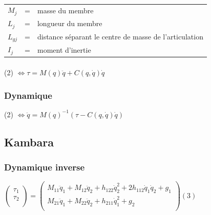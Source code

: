 \documentclass[pdftex,a4paper,11pt]{article}
\begin{document}
\paragraph{}
\begin{tabular}{lcl}
    $M_j$ & = & masse du membre \\
    $L_j$ & = & longueur du membre \\
    $L_{gj}$ & = & distance séparant le centre de masse de l'articulation \\
    $I_{j}$ & = & moment d'inertie \\
\end{tabular}

\paragraph{}
(2) $\Leftrightarrow \tau = M(q)\ddot{q} + C(q, \dot{q}) \dot{q}  $

\subsubsection{Dynamique}
(2) $\Leftrightarrow \ddot{q} = M(q)^{-1} (\tau - C(q, \dot{q}) \dot{q}) $


\subsection{Kambara}

\subsubsection{Dynamique inverse}
$
\begin{pmatrix}
    \tau_1 \\
    \tau_2 \\
\end{pmatrix}
=
\begin{pmatrix}
    M_{11}\ddot{q}_1 + M_{12}\ddot{q}_2 + h_{122}\dot{q}_2^2 + 2h_{112}\dot{q}_1\dot{q}_2 + g_1 \\
    M_{21}\ddot{q}_1 + M_{22}\ddot{q}_2 + h_{211}\dot{q}_1^2 + g_2 \\
\end{pmatrix}
(3)$
\end{document}
